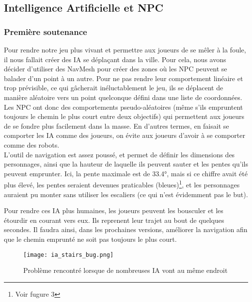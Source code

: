 \subsection{Intelligence Artificielle et NPC}

    \subsubsection{Première soutenance}

        Pour rendre notre jeu plus vivant et permettre aux joueurs de se mêler à la foule,
        il nous fallait créer des IA se déplaçant dans la ville.
        Pour cela, nous avons décider d'utiliser des NavMesh pour créer des zones où les 
        NPC peuvent se balader d'un point à un autre.
        Pour ne pas rendre leur comportement linéaire et trop prévisible, ce qui gâcherait inéluctablement le jeu,
        ils se déplacent de manière aléatoire  vers un point quelconque défini dans une liste de coordonnées.
        Les NPC ont donc des comportements pseudo-aléatoires (même s'ils empruntent toujours le chemin le plus court entre deux objectifs) qui permettent
        aux joueurs de se fondre plus facilement dans la masse. En d'autres termes, en faisait se comporter les IA comme des joueurs, on évite aux joueurs
        d'avoir à se comporter comme des robots.\\

        L’outil de navigation est assez poussé, et permet de définir les dimensions des personnages,
        ainsi que la hauteur de laquelle ils peuvent sauter et les pentes qu’ils peuvent emprunter.
        Ici, la pente maximale est de 33.4°, mais si ce chiffre avait été plus élevé,
        les pentes seraient devenues praticables (bleues)\footnote{Voir fugure 3}, et les personnages auraient pu
        monter sans utiliser les escaliers (ce qui n’est évidemment pas le but).


        Pour rendre ces IA plus humaines, les joueurs peuvent les bousculer et les étourdir en courant vers eux.
        Ils reprenent leur trajet au bout de quelques secondes. Il faudra ainsi, dans les prochaines versions, 
        améliorer la navigation afin que le chemin emprunté ne soit pas toujours le plus court. 
        \newline

        \begin{figure}[h!]
                \centering
                \texttt{[image: ia\_stairs\_bug.png]}
                \caption{Problème rencontré lorsque de nombreuses IA vont au même endroit}
        \end{figure}


